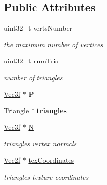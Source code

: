 \subsection*{Public Attributes}
\begin{DoxyCompactItemize}
\item 
uint32\+\_\+t \hyperlink{class_mesh_a77cc0257fcf6e780b4d286a97e94ec3c}{verts\+Number}\hypertarget{class_mesh_a77cc0257fcf6e780b4d286a97e94ec3c}{}\label{class_mesh_a77cc0257fcf6e780b4d286a97e94ec3c}

\begin{DoxyCompactList}\small\item\em the maximum number of vertices \end{DoxyCompactList}\item 
uint32\+\_\+t \hyperlink{class_mesh_a6cf23eafd1fca3375dcd7ed805f32340}{num\+Tris}\hypertarget{class_mesh_a6cf23eafd1fca3375dcd7ed805f32340}{}\label{class_mesh_a6cf23eafd1fca3375dcd7ed805f32340}

\begin{DoxyCompactList}\small\item\em number of triangles \end{DoxyCompactList}\item 
\hyperlink{class_vec3}{Vec3f} $\ast$ {\bfseries P}\hypertarget{class_mesh_a91cae04d549f592177b9104dba5e5493}{}\label{class_mesh_a91cae04d549f592177b9104dba5e5493}

\item 
\hyperlink{class_triangle}{Triangle} $\ast$ {\bfseries triangles}\hypertarget{class_mesh_a74b9072205dbcd86daf35656ff6c870b}{}\label{class_mesh_a74b9072205dbcd86daf35656ff6c870b}

\item 
\hyperlink{class_vec3}{Vec3f} $\ast$ \hyperlink{class_mesh_ae91aa0ddddbfb275fbe1404645f3a8b2}{N}\hypertarget{class_mesh_ae91aa0ddddbfb275fbe1404645f3a8b2}{}\label{class_mesh_ae91aa0ddddbfb275fbe1404645f3a8b2}

\begin{DoxyCompactList}\small\item\em triangles vertex normals \end{DoxyCompactList}\item 
\hyperlink{class_vec2}{Vec2f} $\ast$ \hyperlink{class_mesh_a1d0eabdf7f546ca3d17ed3727a7baf35}{tex\+Coordinates}\hypertarget{class_mesh_a1d0eabdf7f546ca3d17ed3727a7baf35}{}\label{class_mesh_a1d0eabdf7f546ca3d17ed3727a7baf35}

\begin{DoxyCompactList}\small\item\em triangles texture coordinates \end{DoxyCompactList}\end{DoxyCompactItemize}


